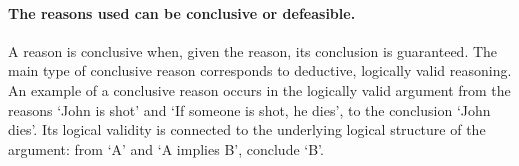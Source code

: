 \documentclass[10pt]{article}
\begin{document}
\paragraph{The reasons used can be conclusive or 
defeasible.} A reason is conclusive when, given the reason, its conclusion is guaranteed. The main type of conclusive reason corresponds to 
deductive, logically valid reasoning. 
An example of a conclusive reason occurs in the logically valid argument from the reasons `John is shot' and `If someone is shot, he dies', to 
the conclusion `John dies'. 
Its logical validity is connected to the underlying logical structure of the argument: 
from `A' and `A implies B', conclude `B'. 
\end{document}

